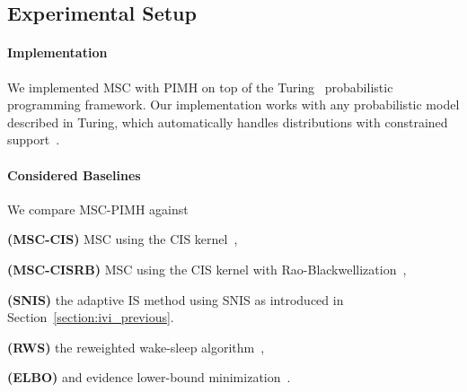 \subsection{Experimental Setup}
\paragraph{Implementation}
We implemented MSC with PIMH on top of the Turing~\citep{ge2018t} probabilistic programming framework.
Our implementation works with any probabilistic model described in Turing, which automatically handles distributions with constrained support~\citep{JMLR:v18:16-107}.

\paragraph{Considered Baselines}
We compare MSC-PIMH against
\begin{enumerate*}[label=\textbf{(\roman*)}]
  \item \textbf{(MSC-CIS)} MSC using the CIS kernel~\citep{NEURIPS2020_b2070693}, 
  \item \textbf{(MSC-CISRB)} MSC using the CIS kernel with Rao-Blackwellization~\citep{NEURIPS2020_b2070693},
  \item \textbf{(SNIS)} the adaptive IS method using SNIS as introduced in Section~\ref{section:ivi_previous}.
  \item \textbf{(RWS)} the reweighted wake-sleep algorithm~\citep{DBLP:journals/corr/BornscheinB14}, 
  \item \textbf{(ELBO)} and evidence lower-bound minimization~\citep{pmlr-v33-ranganath14, JMLR:v18:16-107}.
\end{enumerate*}


